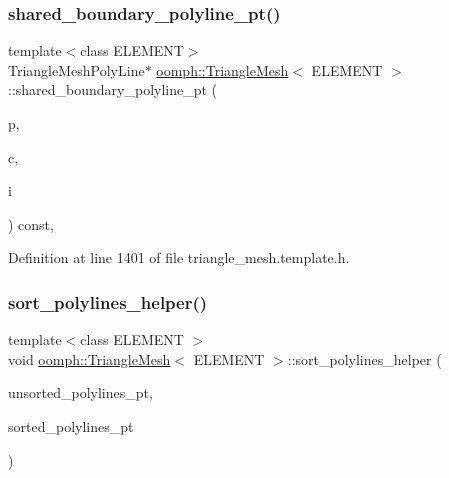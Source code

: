 \subsubsection{\texorpdfstring{shared\+\_\+boundary\+\_\+polyline\+\_\+pt()}{shared\_boundary\_polyline\_pt()}\hspace{0.1cm}{\footnotesize\ttfamily [2/2]}}
{\footnotesize\ttfamily template$<$class E\+L\+E\+M\+E\+NT$>$ \\
Triangle\+Mesh\+Poly\+Line$\ast$ \hyperlink{classoomph_1_1TriangleMesh}{oomph\+::\+Triangle\+Mesh}$<$ E\+L\+E\+M\+E\+NT $>$\+::shared\+\_\+boundary\+\_\+polyline\+\_\+pt (\begin{DoxyParamCaption}\item[{const unsigned \&}]{p,  }\item[{const unsigned \&}]{c,  }\item[{const unsigned \&}]{i }\end{DoxyParamCaption}) const\hspace{0.3cm}{\ttfamily [inline]}, {\ttfamily [protected]}}



Definition at line 1401 of file triangle\+\_\+mesh.\+template.\+h.

\mbox{\label{classoomph_1_1TriangleMesh_a632ac516b32a114af5b80eb25a87aed5}} 
\subsubsection{\texorpdfstring{sort\+\_\+polylines\+\_\+helper()}{sort\_polylines\_helper()}}
{\footnotesize\ttfamily template$<$class E\+L\+E\+M\+E\+NT $>$ \\
void \hyperlink{classoomph_1_1TriangleMesh}{oomph\+::\+Triangle\+Mesh}$<$ E\+L\+E\+M\+E\+NT $>$\+::sort\+\_\+polylines\+\_\+helper (\begin{DoxyParamCaption}\item[{Vector$<$ Triangle\+Mesh\+Poly\+Line $\ast$$>$ \&}]{unsorted\+\_\+polylines\+\_\+pt,  }\item[{Vector$<$ Vector$<$ Triangle\+Mesh\+Poly\+Line $\ast$$>$ $>$ \&}]{sorted\+\_\+polylines\+\_\+pt }\end{DoxyParamCaption})\hspace{0.3cm}{\ttfamily [protected]}}



